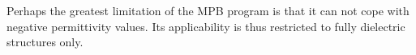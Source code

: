 Perhaps the greatest limitation of the MPB program is that it can not cope with negative permittivity values. Its applicability is thus restricted to fully dielectric structures only.	




